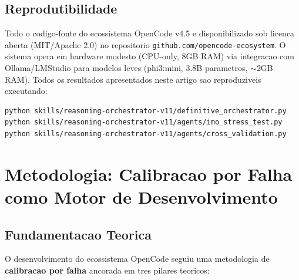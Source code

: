 \documentclass[5p]{elsarticle}
\begin{document}
\subsection{Reprodutibilidade}

Todo o codigo-fonte do ecossistema OpenCode v4.5 e disponibilizado sob licenca
aberta (MIT/Apache 2.0) no repositorio \texttt{github.com/opencode-ecosystem}.
O sistema opera em hardware modesto (CPU-only, 8GB RAM) via integracao com
Ollama/LMStudio para modelos leves (phi3:mini, 3.8B parametros, $\sim$2GB RAM).
Todos os resultados apresentados neste artigo sao reproduziveis executando:

\begin{Verbatim}[fontsize=\small]
python skills/reasoning-orchestrator-v11/definitive_orchestrator.py
python skills/reasoning-orchestrator-v11/agents/imo_stress_test.py
python skills/reasoning-orchestrator-v11/agents/cross_validation.py
\end{Verbatim}

\section{Metodologia: Calibracao por Falha como Motor de Desenvolvimento}

\subsection{Fundamentacao Teorica}

O desenvolvimento do ecossistema OpenCode seguiu uma metodologia de
\textbf{calibracao por falha} ancorada em tres pilares teoricos:
\end{document}
